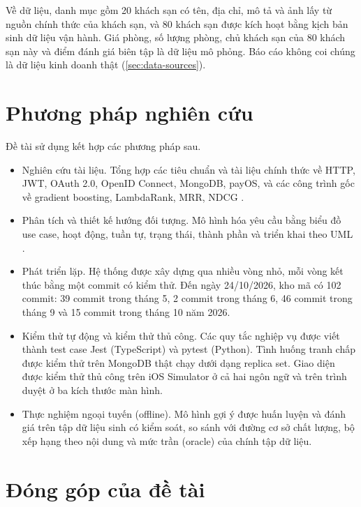 Về dữ liệu, danh mục gồm 20 khách sạn có tên, địa chỉ, mô tả và ảnh lấy từ nguồn chính thức của khách sạn, và 80 khách sạn được kích hoạt bằng kịch bản sinh dữ liệu vận hành. Giá phòng, số lượng phòng, chủ khách sạn của 80 khách sạn này và điểm đánh giá biên tập là dữ liệu mô phỏng. Báo cáo không coi chúng là dữ liệu kinh doanh thật (\cref{sec:data-sources}).

\section{Phương pháp nghiên cứu}\label{sec:method}

Đề tài sử dụng kết hợp các phương pháp sau.

\begin{itemize}
\item Nghiên cứu tài liệu. Tổng hợp các tiêu chuẩn và tài liệu chính thức về HTTP, JWT, OAuth 2.0, OpenID Connect, MongoDB, payOS, và các công trình gốc về gradient boosting, LambdaRank, MRR, NDCG \cite{rfc9110,rfc7519,rfc6749,oidc,mongodbtx,payosdocs,friedman2001,burges2010,jarvelin2002,voorhees1999}.
\item Phân tích và thiết kế hướng đối tượng. Mô hình hóa yêu cầu bằng biểu đồ use case, hoạt động, tuần tự, trạng thái, thành phần và triển khai theo UML \cite{fowler2003uml}.
\item Phát triển lặp. Hệ thống được xây dựng qua nhiều vòng nhỏ, mỗi vòng kết thúc bằng một commit có kiểm thử. Đến ngày 24/10/2026, kho mã có 102 commit: 39 commit trong tháng 5, 2 commit trong tháng 6, 46 commit trong tháng 9 và 15 commit trong tháng 10 năm 2026.
\item Kiểm thử tự động và kiểm thử thủ công. Các quy tắc nghiệp vụ được viết thành test case Jest (TypeScript) và pytest (Python). Tình huống tranh chấp được kiểm thử trên MongoDB thật chạy dưới dạng replica set. Giao diện được kiểm thử thủ công trên iOS Simulator ở cả hai ngôn ngữ và trên trình duyệt ở ba kích thước màn hình.
\item Thực nghiệm ngoại tuyến (offline). Mô hình gợi ý được huấn luyện và đánh giá trên tập dữ liệu sinh có kiểm soát, so sánh với đường cơ sở chất lượng, bộ xếp hạng theo nội dung và mức trần (oracle) của chính tập dữ liệu.
\end{itemize}

\section{Đóng góp của đề tài}\label{sec:contrib}

